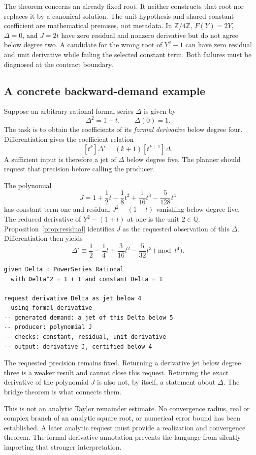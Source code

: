 \documentclass[11pt,letterpaper]{article}
\newcommand{\Z}{\mathbb Z}
\newcommand{\Q}{\mathbb Q}
\theoremstyle{remark}
\begin{document}
The theorem concerns an already fixed root. It neither constructs that root
nor replaces it by a canonical solution. The unit hypothesis and shared
constant coefficient are mathematical premises, not metadata. In $\Z/4\Z$,
$F(Y)=2Y$, $\Delta=0$, and $J=2t$ have zero residual and nonzero derivative
but do not agree below degree two. A candidate for the wrong root of
$Y^2-1$ can have zero residual and unit derivative while failing the selected
constant term. Both failures must be diagnosed at the contract boundary.

\subsection{A concrete backward-demand example}
Suppose an arbitrary rational formal series $\Delta$ is given by
\[
 \Delta^2=1+t,\qquad \Delta(0)=1.
\]
The task is to obtain the coefficients of its \emph{formal derivative} below
degree four. Differentiation gives the coefficient relation
\[
 [t^k]\Delta'=(k+1)[t^{k+1}]\Delta.
\]
A sufficient input is therefore a jet of $\Delta$ below degree five. The
planner should request that precision before calling the producer.

The polynomial
\[
 J=1+\frac12t-\frac18t^2+\frac1{16}t^3-\frac5{128}t^4
\]
has constant term one and residual $J^2-(1+t)$ vanishing below degree five.
The reduced derivative of $Y^2-(1+t)$ at one is the unit $2\in\Q$.
Proposition~\ref{prop:residual} identifies $J$ as the requested observation of
this $\Delta$. Differentiation then yields
\[
 \Delta'\equiv
 \frac12-\frac14t+\frac3{16}t^2-\frac5{32}t^3
 \pmod{t^4}.
\]

\begin{lstlisting}[caption={A demand-driven observation with no object substitution.}]
given Delta : PowerSeries Rational
  with Delta^2 = 1 + t and constant Delta = 1

request derivative Delta as jet below 4
  using formal_derivative
-- generated demand: a jet of this Delta below 5
-- producer: polynomial J
-- checks: constant, residual, unit derivative
-- output: derivative J, certified below 4
\end{lstlisting}

The requested precision remains fixed. Returning a derivative jet below degree
three is a weaker result and cannot close this request. Returning the exact
derivative of the polynomial $J$ is also not, by itself, a statement about
$\Delta$. The bridge theorem is what connects them.

This is not an analytic Taylor remainder estimate. No convergence radius,
real or complex branch of an analytic square root, or numerical error bound
has been established. A later analytic request must provide a realization and
convergence theorem. The formal derivative annotation prevents the language
from silently importing that stronger interpretation.
\end{document}

